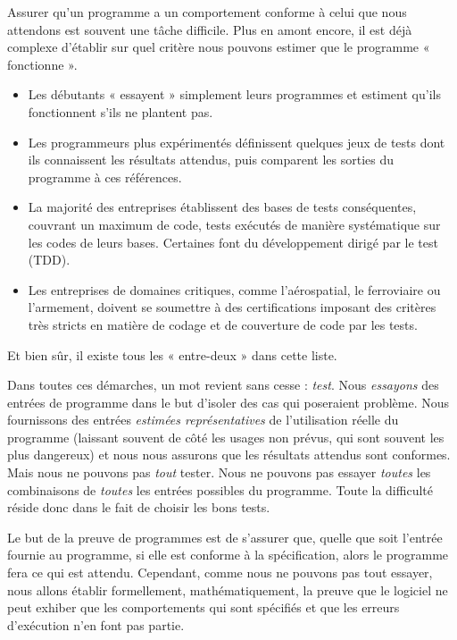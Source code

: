

Assurer qu'un programme a un comportement conforme à celui que nous attendons
est souvent une tâche difficile. Plus en amont encore, il est déjà complexe
d'établir sur quel critère nous pouvons estimer que le programme « fonctionne ».



\begin{itemize}
\item Les débutants « essayent » simplement leurs programmes et estiment qu'ils
fonctionnent s'ils ne plantent pas.
\item Les programmeurs plus expérimentés définissent quelques jeux de tests dont
ils connaissent les résultats attendus, puis comparent les sorties du programme
à ces références.
\item La majorité des entreprises établissent des bases de tests conséquentes,
couvrant un maximum de code, tests exécutés de manière systématique sur les
codes de leurs bases. Certaines font du développement dirigé par le test (TDD).
\item Les entreprises de domaines critiques, comme l'aérospatial, le ferroviaire ou
l'armement, doivent se soumettre à des certifications imposant des critères très
stricts en matière de codage et de couverture de code par les tests.
\end{itemize}


Et bien sûr, il existe tous les « entre-deux » dans cette liste.



Dans toutes ces démarches, un mot revient sans cesse : \textit{test}. Nous
\textit{essayons} des entrées de
programme dans le but d'isoler des cas qui poseraient problème. Nous fournissons
des entrées \textit{estimées représentatives} de l'utilisation réelle du programme
(laissant souvent de côté les usages non prévus, qui sont souvent les plus
dangereux) et
nous nous assurons que les résultats attendus sont conformes. Mais nous ne
pouvons pas \textit{tout} tester. Nous ne pouvons pas essayer \textit{toutes} les
combinaisons de \textit{toutes} les entrées possibles du programme. Toute la
difficulté réside donc dans le fait de choisir les bons tests.



Le but de la preuve de programmes est de s'assurer que, quelle que soit l'entrée
fournie au programme, si elle est conforme à la spécification, alors le programme
fera ce qui est attendu. Cependant, comme nous ne pouvons pas tout essayer, nous
allons établir formellement, mathématiquement, la preuve que le logiciel ne
peut exhiber que les comportements qui sont spécifiés et que les erreurs
d'exécution n'en font pas partie.



